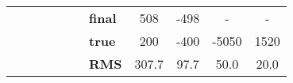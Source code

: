 \documentclass[10pt,titlepage]{article}
\providecommand{\DIFaddendFL}{} %
\begin{document}
\begin{table}
{\begin{tabular}{l | c c c c c | l c c c c}
\multirow{4}{*}{} & \multirow{4}{*}{} & \multirow{4}{*}{} & \multirow{4}{*}{} & \multirow{4}{*}{} & \multirow{4}{*}{} & \textbf{final}& 508 & -498 & - & - \\ 
\multirow{4}{*}{} & \multirow{4}{*}{} & \multirow{4}{*}{} & \multirow{4}{*}{} & \multirow{4}{*}{} & \multirow{4}{*}{} & \textbf{true}& 200 & -400 & -5050 & 1520 \\ 
\multirow{4}{*}{} & \multirow{4}{*}{} & \multirow{4}{*}{} & \multirow{4}{*}{} & \multirow{4}{*}{} & \multirow{4}{*}{} & \textbf{RMS} & 307.7 & 97.7 & 50.0 & 20.0 \\ 
\hline
\end{tabular}
}
\DIFaddendFL \label{table:compare_tool}
\end{table}
\end{document}
